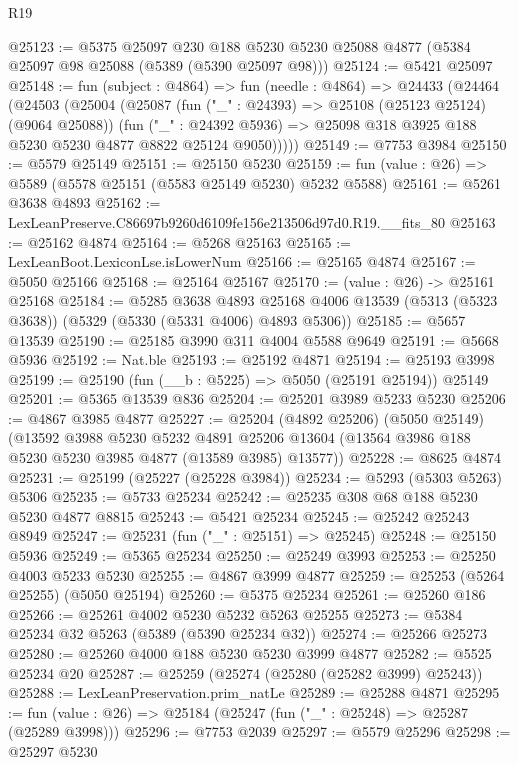 \begin{lexlean}{R19}
\begin{coremodule}
@25123 := @5375
    @25097
    @230
    @188
    @5230
    @5230
    @25088
    @4877
    (@5384 @25097 @98 @25088 (@5389 (@5390 @25097 @98)))
@25124 := @5421 @25097
@25148 := fun (subject : @4864) =>
  fun (needle : @4864) =>
  @24433
    (@24464
      (@24503
        (@25004
          (@25087
            (fun ("_" : @24393) => @25108 (@25123 @25124) (@9064 @25088))
            (fun ("_" : @24392 @5936) =>
            @25098 @318 @3925 @188 @5230 @5230 @4877 @8822 @25124 @9050)))))
@25149 := @7753 @3984
@25150 := @5579 @25149
@25151 := @25150 @5230
@25159 := fun (value : @26) => @5589 (@5578 @25151 (@5583 @25149 @5230) @5232 @5588)
@25161 := @5261 @3638 @4893
@25162 := LexLeanPreserve.C86697b9260d6109fe156e213506d97d0.R19.__fits_80
@25163 := @25162 @4874
@25164 := @5268 @25163
@25165 := LexLeanBoot.LexiconLse.isLowerNum
@25166 := @25165 @4874
@25167 := @5050 @25166
@25168 := @25164 @25167
@25170 := (value : @26) -> @25161 @25168
@25184 := @5285
    @3638
    @4893
    @25168
    @4006
    @13539
    (@5313 (@5323 @3638))
    (@5329 (@5330 (@5331 @4006) @4893 @5306))
@25185 := @5657 @13539
@25190 := @25185 @3990 @311 @4004 @5588 @9649
@25191 := @5668 @5936
@25192 := Nat.ble
@25193 := @25192 @4871
@25194 := @25193 @3998
@25199 := @25190 (fun (__b : @5225) => @5050 (@25191 @25194)) @25149
@25201 := @5365 @13539 @836
@25204 := @25201 @3989 @5233 @5230
@25206 := @4867 @3985 @4877
@25227 := @25204
    (@4892 @25206)
    (@5050 @25149)
    (@13592
      @3988
      @5230
      @5232
      @4891
      @25206
      @13604
      (@13564 @3986 @188 @5230 @5230 @3985 @4877 (@13589 @3985) @13577))
@25228 := @8625 @4874
@25231 := @25199 (@25227 (@25228 @3984))
@25234 := @5293 (@5303 @5263) @5306
@25235 := @5733 @25234
@25242 := @25235 @308 @68 @188 @5230 @5230 @4877 @8815
@25243 := @5421 @25234
@25245 := @25242 @25243 @8949
@25247 := @25231 (fun ("_" : @25151) => @25245)
@25248 := @25150 @5936
@25249 := @5365 @25234
@25250 := @25249 @3993
@25253 := @25250 @4003 @5233 @5230
@25255 := @4867 @3999 @4877
@25259 := @25253 (@5264 @25255) (@5050 @25194)
@25260 := @5375 @25234
@25261 := @25260 @186
@25266 := @25261 @4002 @5230 @5232 @5263 @25255
@25273 := @5384 @25234 @32 @5263 (@5389 (@5390 @25234 @32))
@25274 := @25266 @25273
@25280 := @25260 @4000 @188 @5230 @5230 @3999 @4877
@25282 := @5525 @25234 @20
@25287 := @25259 (@25274 (@25280 (@25282 @3999) @25243))
@25288 := LexLeanPreservation.prim_natLe
@25289 := @25288 @4871
@25295 := fun (value : @26) => @25184 (@25247 (fun ("_" : @25248) => @25287 (@25289 @3998)))
@25296 := @7753 @2039
@25297 := @5579 @25296
@25298 := @25297 @5230

\end{coremodule}
\end{lexlean}
